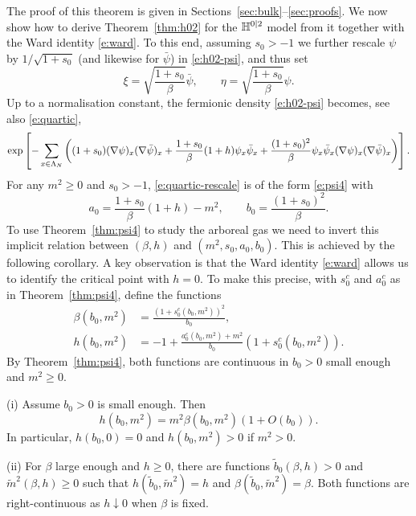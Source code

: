 \documentclass[11pt]{amsart}
\numberwithin{equation}{section}
\numberwithin{theorem}{section}
\newcommand{\1}{{\bf 1}}
\begin{document}
The proof of this theorem is given  in Sections~\ref{sec:bulk}--\ref{sec:proofs}. 
We now show how to derive Theorem~\ref{thm:h02} for the $\mathbb{H}^{0|2}$ model from it together with the Ward identity
\eqref{e:ward}. 
To this end, assuming $s_0>-1$ we further rescale $\psi$ by $1/\sqrt{1+s_0}$
(and likewise for $\bar\psi$) in \eqref{e:h02-psi}, and thus set
\begin{equation} \label{e:xietapsi}
  \xi = \sqrt{\frac{1+s_0}{\beta}} \bar\psi, \qquad \eta=\sqrt{\frac{1+s_0}{\beta}} \psi.
\end{equation}
Up to a normalisation constant, the fermionic density
\eqref{e:h02-psi} becomes, see also \eqref{e:quartic},
\begin{equation}
  \label{e:quartic-rescale}
  \exp\left[{-\sum_{x\in\Lambda_N}\left({(1+s_0) (\nabla\psi)_x(\nabla\bar\psi)_x
    +\frac{1+s_0}{\beta}(1+h) \psi_x\bar\psi_x + \frac{(1+s_0)^2}{\beta} \psi_x\bar\psi_x (\nabla \psi)_x(\nabla \bar\psi)_x}\right)
  }\right].
\end{equation}
For any $m^2 \geq 0$ and $s_0>-1$, \eqref{e:quartic-rescale} is of the form \eqref{e:psi4} with
\begin{equation}
  a_0 = \frac{1+s_0}{\beta}(1+h) -m^2, \qquad b_0 = \frac{(1+s_0)^2}{\beta}.
\end{equation}
To use Theorem~\ref{thm:psi4} to study the arboreal gas we need to invert this implicit relation between $(\beta,h)$
and $(m^2,s_0,a_0,b_0)$.
This is achieved by the following corollary.
A key observation is that the Ward identity \eqref{e:ward} allows us to identify the critical point with $h=0$.
To make this precise, with $s_0^c$ and $a_0^c$ as in
Theorem~\ref{thm:psi4}, define the functions
\begin{align}
  \label{e:betab0m}
  \beta(b_0,m^2) &= \frac{(1+s_0^c(b_0,m^2))^2}{b_0},\\
    \label{e:hb0m}
  h(b_0,m^2) &= -1+ \frac{a_0^c(b_0,m^2)+m^2}{b_0} (1+s_0^c(b_0,m^2)).
\end{align}
By Theorem~\ref{thm:psi4}, both functions are continuous in $b_0>0$ small enough and $m^2 \geq 0$.

\begin{corollary} \label{cor:ward}
  (i) Assume $b_0>0$ is small enough. Then
  \begin{equation}
    h(b_0,m^2) = m^2 \beta(b_0,m^2)(1+O(b_0)).
  \end{equation}
  In particular, $h(b_0,0) = 0$ and $h(b_0,m^2)>0$ if $m^2>0$.

  (ii) For $\beta$ large enough and $h\geq 0$, there are functions $\tilde b_0(\beta,h)>0$ and $\tilde m^2(\beta,h)\geq 0$ such that
  $h(\tilde b_0,\tilde m^2)=h$ and $\beta(\tilde b_0,\tilde m^2)=\beta$.
  Both functions are right-continuous as $h\downarrow 0$ when $\beta$ is fixed.
\end{corollary}
\end{document}
